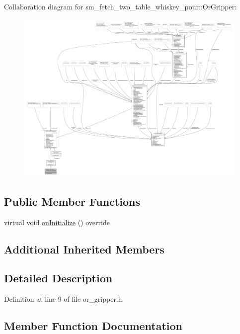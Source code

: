 Collaboration diagram for sm\+\_\+fetch\+\_\+two\+\_\+table\+\_\+whiskey\+\_\+pour\+:\+:Or\+Gripper\+:
\nopagebreak
\begin{figure}[H]
\begin{center}
\leavevmode
\includegraphics[width=350pt]{classsm__fetch__two__table__whiskey__pour_1_1OrGripper__coll__graph}
\end{center}
\end{figure}
\subsection*{Public Member Functions}
\begin{DoxyCompactItemize}
\item 
virtual void \hyperlink{classsm__fetch__two__table__whiskey__pour_1_1OrGripper_a101aa0912ba2732228582b0e599e0de9}{on\+Initialize} () override
\end{DoxyCompactItemize}
\subsection*{Additional Inherited Members}


\subsection{Detailed Description}


Definition at line 9 of file or\+\_\+gripper.\+h.



\subsection{Member Function Documentation}
\mbox{\label{classsm__fetch__two__table__whiskey__pour_1_1OrGripper_a101aa0912ba2732228582b0e599e0de9}} 

